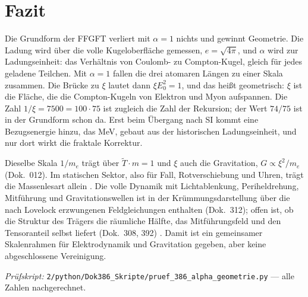 \section{Fazit}

Die Grundform der FFGFT verliert mit $\alpha=1$ nichts und gewinnt Geometrie. Die Ladung wird über
die volle Kugeloberfläche gemessen, $e=\sqrt{4\pi}$, und $\alpha$ wird zur Ladungseinheit: das
Verhältnis von Coulomb- zu Compton-Kugel, gleich für jedes geladene Teilchen. Mit $\alpha=1$
fallen die drei atomaren Längen zu einer Skala zusammen. Die Brücke zu $\xi$ lautet dann
$\xi E_0^2=1$, und das heißt geometrisch: $\xi$ ist die Fläche, die die Compton-Kugeln von
Elektron und Myon aufspannen. Die Zahl $1/\xi=7500=100\cdot75$ ist zugleich die Zahl der
Rekursion; der Wert $74/75$ ist in der Grundform schon da. Erst beim Übergang nach SI kommt eine
Bezugsenergie hinzu, das MeV, gebaut aus der historischen Ladungseinheit, und nur dort wirkt die
fraktale Korrektur.

Dieselbe Skala $1/m_e$ trägt über $\tilde T\cdot m=1$ und $\xi$ auch die Gravitation, $G\propto\xi^2/m_e$
(Dok.~012). Im statischen Sektor, also für Fall, Rotverschiebung und Uhren, trägt die Massenlesart
allein \KM. Die volle Dynamik mit Lichtablenkung, Periheldrehung, Mitführung und
Gravitationswellen ist in der Krümmungsdarstellung über die nach Lovelock erzwungenen
Feldgleichungen enthalten (Dok.~312); offen ist, ob die Struktur des Trägers die räumliche Hälfte,
das Mitführungsfeld und den Tensoranteil selbst liefert (Dok.~308, 392) \SM. Damit ist ein
gemeinsamer Skalenrahmen für Elektrodynamik und Gravitation gegeben, aber keine abgeschlossene
Vereinigung.

\vspace{1em}
\noindent\textit{Prüfskript:} \texttt{2/python/Dok386\_Skripte/pruef\_386\_alpha\_geometrie.py}
--- alle Zahlen nachgerechnet.
